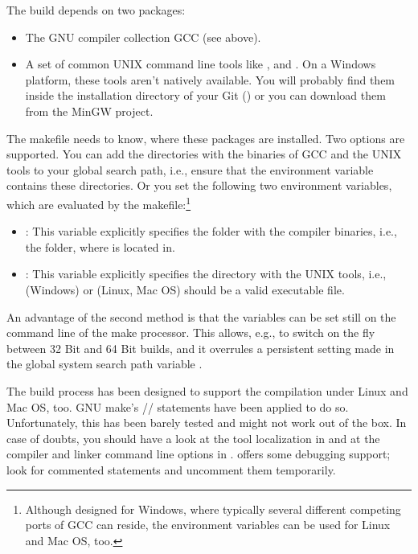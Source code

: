 \noindent
The build depends on two packages:

\begin{itemize}
  \item The GNU compiler collection GCC (see above).
  \item A set of common UNIX command line tools like ,
     and . On a Windows platform, these tools aren't
    natively available. You will probably find them inside the
    installation directory of your Git 
    ()
    or you can download them from the MinGW project.
\end{itemize}
 
The makefile needs to know, where these packages are installed. Two
options are supported. You can add the directories with the binaries of
GCC and the UNIX tools to your global search path, i.e., ensure that the
environment variable  contains these directories. Or you set
the following two environment variables, which are evaluated by the
makefile:\footnote{Although designed for Windows, where typically several
different competing ports of GCC can reside, the environment variables can
be used for Linux and Mac OS, too.}

\begin{itemize}
  \item {}: This variable explicitly specifies the folder
    with the compiler binaries, i.e., the folder, where  is
    located in.
  \item {}: This variable explicitly specifies the
    directory with the UNIX tools, i.e.,
     (Windows) or
     (Linux, Mac OS) should be a valid executable file.
\end{itemize}

An advantage of the second method is that the variables can be set
still on the command line of the make processor. This allows, e.g., to
switch on the fly between 32 Bit and 64 Bit builds, and it overrules a
persistent setting made in the global system search path variable
.

The build process has been designed to support the compilation under Linux
and Mac OS, too. GNU make's // statements
have been applied to do so. Unfortunately, this has been barely tested and
might not work out of the box. In case of doubts, you should have a look
at the tool localization in  and at the compiler and
linker command line options in .
 offers some debugging support; look for commented
 statements and uncomment them temporarily.

